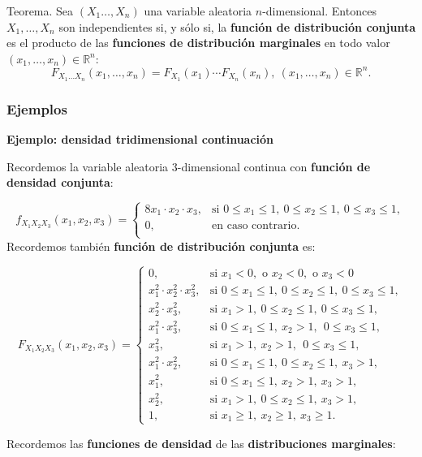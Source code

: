 \documentclass[]{book}
\begin{document}
Teorema.
Sea \((X_1\ldots,X_n)\) una variable aleatoria \(n\)-dimensional. Entonces
\(X_1,\ldots,X_n\) son independientes si, y sólo si, la \textbf{función de distribución conjunta} es el producto de las \textbf{funciones de distribución marginales} en todo valor \((x_1,\ldots,x_n)\in\mathbb{R}^n\):
\[
F_{X_1\ldots X_n}(x_1,\ldots,x_n)=F_{X_1}(x_1)\cdots F_{X_n}(x_n),\ (x_1,\ldots,x_n)\in\mathbb{R}^n.
\]

\hypertarget{ejemplos-11}{%
\subsubsection{Ejemplos}\label{ejemplos-11}}

\textbf{Ejemplo: densidad tridimensional continuación}

Recordemos la variable aleatoria \(3\)-dimensional continua con \textbf{función de densidad conjunta}:

\[
f_{X_1X_2X_3}(x_1,x_2,x_3)=\begin{cases}
8 x_1\cdot x_2\cdot x_3, & \mbox{si }0\leq x_1\leq 1,\ 0\leq x_2\leq 1,\ 0\leq x_3\leq 1, \\
0, & \mbox{en caso contrario.}\\
\end{cases}
\]
Recordemos también \textbf{función de distribución conjunta} es:

\[
F_{X_1X_2X_3}(x_1,x_2,x_3)=\begin{cases}
0, & \mbox{si }x_1<0,\mbox{ o }x_2<0,\mbox{ o }x_3 <0\\
x_1^2\cdot x_2^2\cdot x_3^2, & \mbox{si }0\leq x_1\leq 1,\ 0\leq x_2\leq 1,\ 0\leq x_3\leq 1, \\
 x_2^2\cdot x_3^2, & \mbox{si }x_1> 1,\ 0\leq x_2\leq  1,\ 0\leq x_3\leq  1, \\
 x_1^2\cdot x_3^2, & \mbox{si }0\leq x_1\leq  1,\ x_2> 1,\ \ 0\leq x_3\leq  1, \\
 x_3^2, & \mbox{si }x_1> 1,\ x_2> 1,\ \ 0\leq x_3\leq  1, \\
 x_1^2\cdot x_2^2, & \mbox{si }0\leq x_1\leq  1,\ 0\leq x_2\leq  1,\ x_3> 1,\\
 x_1^2, & \mbox{si }0\leq x_1\leq  1,\ x_2 >  1,\ x_3> 1,\\
 x_2^2, & \mbox{si }x_1>1,\ 0\leq x_2\leq  1,\ x_3> 1,\\
1, & \mbox{si }x_1\geq 1,\ x_2\geq 1,\ x_3\geq 1.
\end{cases}
\]

Recordemos las \textbf{funciones de densidad} de las \textbf{distribuciones marginales}:
\end{document}
